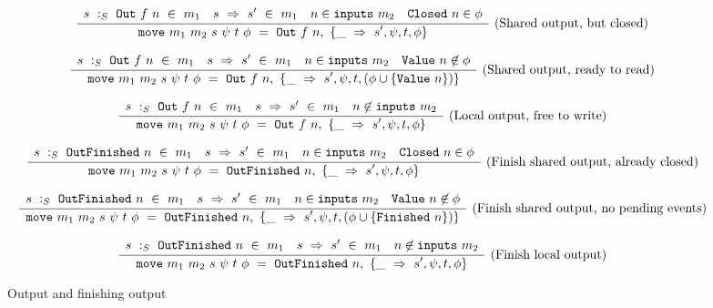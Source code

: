 \begin{figure*}


$$
\ruleI
{
    \arrLCCR
        { \CheckStateTypeM{m_1}{s}{\Out{f}{n}} }
        { \TransUM{s}{s'}{m_1} }
        { n \in \inputs{m_2} }
        { \Closed{n} \in \phi }
}
{
    \MoveOut
        {\sptp}
        {\Out{f}{n}}
        {\MoveTU{\sPptpC}}
}
\textrm{(Shared output, but closed)}
$$

$$
\ruleI
{
    \arrLCCR
        { \CheckStateTypeM{m_1}{s}{\Out{f}{n}} }
        { \TransUM{s}{s'}{m_1} }
        { n \in \inputs{m_2} }
        { \Value{n} \not\in \phi }
}
{
    \MoveOut
        {\sptp}
        {\Out{f}{n}}
        {\MoveTU{s', \psi, t, (\phi \cup \sgl{\Value{n}}) }}
}
\textrm{(Shared output, ready to read)}
$$

$$
\ruleI
{
    \arrLCR
        { \CheckStateTypeM{m_1}{s}{\Out{f}{n}} }
        { \TransUM{s}{s'}{m_1} }
        { n \not\in \inputs{m_2} }
}
{
    \MoveOut
        {\sptp}
        {\Out{f}{n}}
        {\MoveTU{\sPptpC}}
}
\textrm{(Local output, free to write)}
$$

$$
\ruleI
{
    \arrLCCR
        { \CheckStateTypeM{m_1}{s}{\OutFinished{n}} }
        { \TransUM{s}{s'}{m_1} }
        { n \in \inputs{m_2} }
        { \Closed{n} \in \phi }
}
{
    \MoveOut
        {\sptp}
        {\OutFinished{n}}
        {\MoveTU{\sPptpC}}
}
\textrm{(Finish shared output, already closed)}
$$

$$
\ruleI
{
    \arrLCCR
        { \CheckStateTypeM{m_1}{s}{\OutFinished{n}} }
        { \TransUM{s}{s'}{m_1} }
        { n \in \inputs{m_2} }
        { \Value{n} \not\in \phi }
}
{
    \MoveOut
        {\sptp}
        {\OutFinished{n}}
        {\MoveTU{s',\psi,t,(\phi \cup \sgl{\Finished{n}})}}
}
\textrm{(Finish shared output, no pending events)}
$$

$$
\ruleI
{
    \arrLCR
        { \CheckStateTypeM{m_1}{s}{\OutFinished{n}} }
        { \TransUM{s}{s'}{m_1} }
        { n \not\in \inputs{m_2} }
}
{
    \MoveOut
        {\sptp}
        {\OutFinished{n}}
        {\MoveTU{\sPptpC}}
}
\textrm{(Finish local output)}
$$

\caption{Output and finishing output}
\label{fig:merge:gen:out}
\end{figure*}

